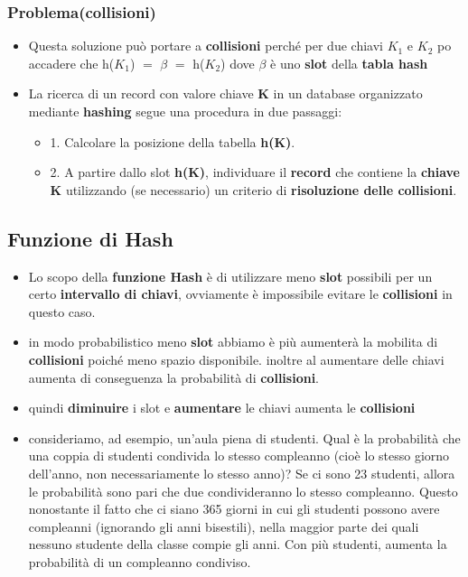 \subsubsection{Problema(collisioni)}
\begin{itemize}
    \item Questa soluzione può portare a \textbf{collisioni} perché per due chiavi $K_1$ e $K_2$ po accadere che h($K_1$) $=$ $\beta$ $=$ h($K_2$)  dove $\beta$ è uno \textbf{slot} della \textbf{tabla hash}
    
    \item La ricerca di un record con valore chiave \textbf{K} in un database organizzato mediante\textbf{ hashing} segue una procedura in due passaggi: 
    \begin{itemize}
        \item 1. Calcolare la posizione della tabella \textbf{ h(K)}.
        \item 2. A partire dallo slot \textbf{h(K)}, individuare il \textbf{record} che contiene la \textbf{chiave} \textbf{K} utilizzando (se necessario) un criterio di \textbf{risoluzione delle collisioni}.
        
    \end{itemize}
  
\end{itemize}

\subsection{Funzione di Hash}
\begin{itemize}
    \item Lo scopo della \textbf{funzione Hash} è di utilizzare meno \textbf{slot} possibili per un certo \textbf{intervallo di chiavi}, ovviamente è impossibile evitare le \textbf{collisioni} in questo caso.
    \item in modo probabilistico meno \textbf{slot} abbiamo è più aumenterà la mobilita di \textbf{collisioni} poiché meno spazio disponibile. inoltre al aumentare delle chiavi aumenta di conseguenza la probabilità di \textbf{collisioni}.
    \item  quindi \textbf{diminuire} i slot e \textbf{aumentare} le chiavi aumenta le \textbf{collisioni}
    \item consideriamo, ad esempio, un'aula piena di studenti. Qual è la probabilità che una coppia di studenti condivida lo stesso compleanno (cioè lo stesso giorno dell'anno, non necessariamente lo stesso anno)? Se ci sono 23 studenti, allora le probabilità sono pari che due condivideranno lo stesso compleanno. Questo nonostante il fatto che ci siano 365 giorni in cui gli studenti possono avere compleanni (ignorando gli anni bisestili), nella maggior parte dei quali nessuno studente della classe compie gli anni. Con più studenti, aumenta la probabilità di un compleanno condiviso.
    
\end{itemize}

